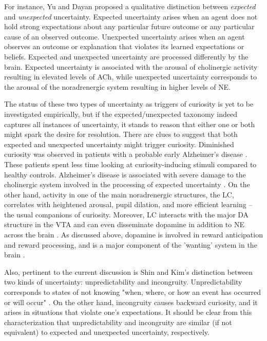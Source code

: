 For instance, Yu and Dayan \citeyearpar{yu_expected_2003,yu_uncertainty_2005} proposed a qualitative distinction between \emph{expected} and \emph{unexpected} uncertainty. Expected uncertainty arises when an agent does not hold strong expectations about any particular future outcome or any particular cause of an observed outcome. Unexpected uncertainty arises when an agent observes an outcome or explanation that violates its learned expectations or beliefs. Expected and unexpected uncertainty are processed differently by the brain. Expected uncertainty is associated with the arousal of cholinergic activity resulting in elevated levels of \ac{ACh}, while unexpected uncertainty corresponds to the arousal of the noradrenergic system resulting in higher levels of \ac{NE}.

The status of these two types of uncertainty as triggers of curiosity is yet to be investigated empirically, but if the expected/unexpected taxonomy indeed captures all instances of uncertainty, it stands to reason that either one or both might spark the desire for resolution. There are clues to suggest that both expected and unexpected uncertainty might trigger curiosity. Diminished curiosity was observed in patients with a probable early Alzheimer's disease \parencite{daffner_diminished_1992}. These patients spent less time looking at curiosity-inducing stimuli compared to healthy controls. Alzheimer's disease is associated with severe damage to the cholinergic system \parencite{ferreira-vieira_alzheimers_2016} involved in the processing of expected uncertainty \parencite{yu_uncertainty_2005}. On the other hand, activity in one of the main noradrenergic structures, the \ac{LC}, correlates with heightened arousal, pupil dilation, and more efficient learning \parencite{breton-provencher_locus_2021} -- the usual companions of curiosity. Moreover, \ac{LC} interacts with the major DA structure in the \ac{VTA} and can even disseminate dopamine in addition to \ac{NE} across the brain \parencite{ranjbar-slamloo_dopamine_2020}. As discussed above, dopamine is involved in reward anticipation and reward processing, and is a major component of the 'wanting' system in the brain \parencite{berridge_debate_2007}.

Also, pertinent to the current discussion is Shin and Kim's \parencite{shin_homo_2019} distinction between two kinds of uncertainty: unpredictability and incongruity. Unpredictability corresponds to states of not knowing "when, where, or how an event has occurred or will occur" \parencite[][p. 13]{shin_homo_2019}. On the other hand, incongruity causes backward curiosity, and it arises in situations that violate one's expectations. It should be clear from this characterization that unpredictability and incongruity are similar (if not equivalent) to expected and unexpected uncertainty, respectively.

